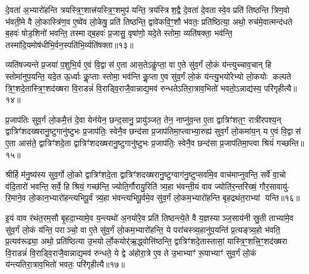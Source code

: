 दे॒वता॑ अ॒भ्यारो॑हन्ति त्रयस्त्रि॒ꣳ॒शात्त्र॑यस्त्रि॒ꣳ॒शमुप॑ यन्ति॒ त्रय॑स्त्रिश॒द्वै दे॒वता॑ दे॒वतास्वे॒व प्रति॑ तिष्ठन्ति त्रिण॒वो भ॑वती॒मे वै लो॒कास्त्रि॑ण॒व ए॒ष्वे॑व लो॒केषु॒ प्रति॑ तिष्ठन्ति॒ द्वावे॑कवि॒ꣳ॒शौ भ॑वतः॒ प्रति॑ष्ठित्या॒ अथो॒ रुच॑मे॒वात्मन्द॑धते ब॒हवः॑ षोड॒शिनो॑ भवन्ति॒ तस्माद्ब॒हवः॑ प्र॒जासु॒ वृषा॑णो॒ यदे॒ते स्तोमा॒ व्यति॑षक्ता॒ भव॑न्ति॒ तस्मा॑दि॒यमोष॑धीभि॒र्वन॒स्पति॑भि॒र्व्यति॑षक्ता॥१३॥

व्यति॑षज्यन्ते प्र॒जया॑ प॒शुभि॒र्य ए॒वं वि॒द्वास॑ ए॒ता आस॒तेऽकॢ॑प्ता॒ वा ए॒ते सु॑व॒र्गं लो॒कं य॑न्त्युच्चाव॒चान् हि स्तोमा॑नुप॒यन्ति॒ यदे॒त ऊ॒र्ध्वाः कॢ॒प्ताः स्तोमा॒ भव॑न्ति कॢ॒प्ता ए॒व सु॑व॒र्गं लो॒कं य॑न्त्यु॒भयो॑रेभ्यो लो॒कयोः कल्पते त्रि॒ꣳ॒शदे॒तास्त्रि॒ꣳ॒शद॑ख्षरा वि॒राडन्नं॑ वि॒राड्वि॒राजै॒वान्नाद्य॒मव॑ रुन्धतेऽतिरा॒त्राव॒भितो॑ भवतो॒ऽन्नाद्य॑स्य॒ परि॑गृहीत्यै॥१४॥

{\anuvakamend[{ओष॑धीस्सं वथ्स॒र ए॒वाव॑ प्रति॒ष्ठाय॒ व्यति॑ष॒क्तैका॒न्नप॑ञ्चा॒शच्च॑॥३॥}]}

प्र॒जाप॑तिः सुव॒र्गं लो॒कमै॒त्तं दे॒वा येन॑येन॒ छन्द॒सानु॒ प्रायु॑ञ्जत॒ तेन॒ नाप्नु॑व॒न्त ए॒ता द्वात्रिꣳ॑शत॒ꣳ॒ रात्री॑रपश्य॒न् द्वात्रिꣳ॑शदख्षरानु॒ष्टुगानु॑ष्टुभः प्र॒जाप॑तिः॒ स्वेनै॒व छन्द॑सा प्र॒जाप॑तिमा॒प्त्वाभ्या॒रुह्य॑ सुव॒र्गं लो॒कमा॑य॒न् य ए॒वं वि॒द्वास॑ ए॒ता आस॑ते॒ द्वात्रिꣳ॑शदे॒ता द्वात्रिꣳ॑शदख्षरानु॒ष्टुगानु॑ष्टुभः प्र॒जाप॑तिः॒ स्वेनै॒व छन्द॑सा प्र॒जाप॑तिमा॒प्त्वा श्रियं॑ गच्छन्ति॥१५॥

श्रीर्\mbox{}हि म॑नु॒ष्य॑स्य सुव॒र्गो लो॒को द्वात्रिꣳ॑शदे॒ता द्वात्रिꣳ॑शदख्षरानु॒ष्टुग्वाग॑नु॒ष्टुप्सर्वा॑मे॒व वाच॑माप्नुवन्ति॒ सर्वे॑ वा॒चो व॑दि॒तारो॑ भवन्ति॒ सर्वे॒ हि श्रियं॒ गच्छ॑न्ति॒ ज्योति॒र्गौरायु॒रिति॑ त्र्य॒हा भ॑वन्ती॒यं वाव ज्योति॑र॒न्तरि॑ख्षं॒ गौर॒सावायु॑- रि॒माने॒व लो॒कान॒भ्यारो॑हन्त्यभिपू॒र्वं त्र्य॒हा भ॑वन्त्यभिपू॒र्वमे॒व सु॑व॒र्गं लो॒कम॒भ्यारो॑हन्ति बृहद्रथंत॒राभ्यां यन्ति॥१६॥

इ॒यं वाव र॑थंत॒रम॒सौ बृ॒हदा॒भ्यामे॒व य॒न्त्यथो॑ अ॒नयो॑रे॒व प्रति॑ तिष्ठन्त्ये॒ते वै य॒ज्ञस्याञ्ज॒साय॑नी स्रु॒ती ताभ्या॑मे॒व सु॑व॒र्गं लो॒कं य॑न्ति॒ पराञ्चो॒ वा ए॒ते सु॑व॒र्गं लो॒कम॒भ्यारो॑हन्ति॒ ये परा॑चस्त्र्य॒हानु॑प॒यन्ति॑ प्र॒त्यङ्त्र्य॒हो भ॑वति॒ प्र॒त्यव॑रूढ्या॒ अथो॒ प्रति॑ष्ठित्या उ॒भयोर्लो॒कयोर्\mbox{}॑ऋ॒द्ध्वोत्ति॑ष्ठन्ति॒ द्वात्रिꣳ॑शदे॒तास्तासां॒ यास्त्रि॒ꣳ॒शत्त्रि॒ꣳ॒शद॑ख्षरा वि॒राडन्नं॑ वि॒राड्वि॒राजै॒वान्नाद्य॒मव॑ रुन्धते॒ ये द्वे अ॑होरा॒त्रे ए॒व ते उ॒भाभ्याꣳ॑ रू॒पाभ्याꣳ॑ सुव॒र्गं लो॒कं य॑न्त्यतिरा॒त्राव॒भितो॑ भवतः॒ परि॑गृहीत्यै॥१७॥

{\anuvakamend[{ग॒च्छ॒न्ति॒ य॒न्ति॒ त्रि॒ꣳ॒शद॑ख्षरा॒ द्वाविꣳ॑शतिश्च॥४॥}]}

